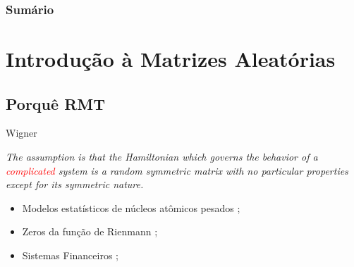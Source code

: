 




\frame{\titlepage}

{
\begin{frame}
\frametitle{Sumário}
\tableofcontents
\end{frame}
}


\section{Introdução à Matrizes Aleatórias}

\subsection{Porquê RMT}

\begin{frame}
	\begin{block}{Wigner}
		\parbox{\linewidth}{\textit{The assumption is that
			the Hamiltonian which governs the behavior of
			a \textcolor{red}{complicated} system is a random symmetric
			matrix with no particular properties except for
			its symmetric nature.}}
	\end{block}

	\vspace{1cm}

	\pause
	\begin{itemize}
		\item Modelos estatísticos de núcleos atômicos pesados \cite{Wigner};
		\item Zeros da função de Rienmann \cite{montgomery};
		\item Sistemas Financeiros \cite[Chapter~2]{fabozziquantitative};
	\end{itemize}
	
	
\end{frame}

